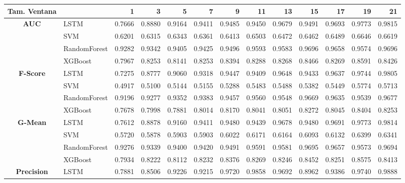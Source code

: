 \begin{table}[h]
	\centering
	\begin{adjustbox}{max width=15cm}
		\begin{tabular}{|c|l|r|r|r|r|r|r|r|r|r|r|r|}
			\hline
			\textbf{Tam. Ventana}&         &      1  &      3  &      5  &      7  &      9  &      11 &      13 &      15 &      17 &      19 &      21 \\
			\hline
			\textbf{AUC} & LSTM &  0.7666 &  0.8880 &  0.9164 &  0.9411 &  0.9485 &  0.9450 &  0.9679 &  0.9491 &  0.9693 &  0.9773 &  0.9815 \\
			& SVM &  0.6201 &  0.6315 &  0.6343 &  0.6361 &  0.6413 &  0.6503 &  0.6472 &  0.6462 &  0.6489 &  0.6646 &  0.6619 \\
			& RandomForest &  0.9282 &  0.9342 &  0.9405 &  0.9425 &  0.9496 &  0.9593 &  0.9583 &  0.9696 &  0.9658 &  0.9574 &  0.9696 \\
			& XGBoost &  0.7967 &  0.8253 &  0.8141 &  0.8253 &  0.8394 &  0.8288 &  0.8268 &  0.8466 &  0.8269 &  0.8591 &  0.8426 \\
			\hline
			\textbf{F-Score} & LSTM &  0.7275 &  0.8777 &  0.9060 &  0.9318 &  0.9447 &  0.9409 &  0.9648 &  0.9433 &  0.9637 &  0.9744 &  0.9805 \\
			& SVM &  0.4917 &  0.5100 &  0.5144 &  0.5155 &  0.5288 &  0.5483 &  0.5488 &  0.5382 &  0.5449 &  0.5774 &  0.5713 \\
			& RandomForest &  0.9196 &  0.9277 &  0.9352 &  0.9383 &  0.9457 &  0.9560 &  0.9548 &  0.9669 &  0.9635 &  0.9539 &  0.9677 \\
			& XGBoost &  0.7678 &  0.7998 &  0.7881 &  0.8014 &  0.8170 &  0.8041 &  0.8051 &  0.8272 &  0.8045 &  0.8404 &  0.8253 \\
			\hline
			\textbf{G-Mean} & LSTM &  0.7612 &  0.8878 &  0.9160 &  0.9411 &  0.9480 &  0.9439 &  0.9678 &  0.9480 &  0.9691 &  0.9773 &  0.9814 \\
			& SVM &  0.5720 &  0.5878 &  0.5903 &  0.5903 &  0.6022 &  0.6171 &  0.6164 &  0.6093 &  0.6132 &  0.6399 &  0.6341 \\
			& RandomForest &  0.9276 &  0.9339 &  0.9400 &  0.9420 &  0.9491 &  0.9591 &  0.9581 &  0.9695 &  0.9657 &  0.9573 &  0.9694 \\
			& XGBoost &  0.7934 &  0.8222 &  0.8112 &  0.8232 &  0.8376 &  0.8269 &  0.8246 &  0.8452 &  0.8251 &  0.8575 &  0.8413 \\
			\hline
			\textbf{Precision} & LSTM &  0.7881 &  0.8506 &  0.9226 &  0.9215 &  0.9720 &  0.9858 &  0.9692 &  0.8962 &  0.9386 &  0.9740 &  0.9888 \\

\end{tabular}
\end{adjustbox}
\end{table}
